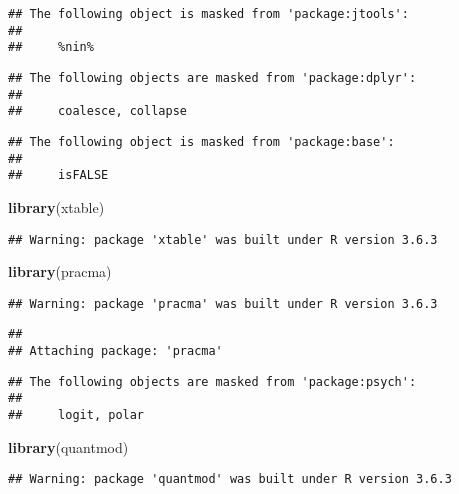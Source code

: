 \documentclass[
]{article}
\newenvironment{Shaded}{\begin{snugshade}}{\end{snugshade}}
\newcommand{\KeywordTok}[1]{\textcolor[rgb]{0.13,0.29,0.53}{\textbf{#1}}}
\newcommand{\NormalTok}[1]{#1}
\begin{document}
\begin{verbatim}
## The following object is masked from 'package:jtools':
## 
##     %nin%
\end{verbatim}

\begin{verbatim}
## The following objects are masked from 'package:dplyr':
## 
##     coalesce, collapse
\end{verbatim}

\begin{verbatim}
## The following object is masked from 'package:base':
## 
##     isFALSE
\end{verbatim}

\begin{Shaded}
\begin{Highlighting}[]
\KeywordTok{library}\NormalTok{(xtable)}
\end{Highlighting}
\end{Shaded}

\begin{verbatim}
## Warning: package 'xtable' was built under R version 3.6.3
\end{verbatim}

\begin{Shaded}
\begin{Highlighting}[]
\KeywordTok{library}\NormalTok{(pracma)}
\end{Highlighting}
\end{Shaded}

\begin{verbatim}
## Warning: package 'pracma' was built under R version 3.6.3
\end{verbatim}

\begin{verbatim}
## 
## Attaching package: 'pracma'
\end{verbatim}

\begin{verbatim}
## The following objects are masked from 'package:psych':
## 
##     logit, polar
\end{verbatim}

\begin{Shaded}
\begin{Highlighting}[]
\KeywordTok{library}\NormalTok{(quantmod)}
\end{Highlighting}
\end{Shaded}

\begin{verbatim}
## Warning: package 'quantmod' was built under R version 3.6.3
\end{verbatim}
\end{document}
